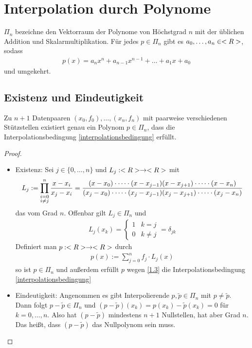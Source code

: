 \section{Interpolation durch Polynome}

$\Pi_n$ bezeichne den Vektorraum der Polynome von Höchstgrad $n$ mit der üblichen Addition und Skalarmultiplikation. Für jedes $p\in\Pi_n$ gibt es $a_0,\dots,a_n\in<R>$, sodass
\begin{align}
	p(x) = a_nx^n+a_{n-1}x^{n-1}+\dots+a_1x+a_0
\end{align}
und umgekehrt.

\subsection{Existenz und Eindeutigkeit}

\begin{proposition}
	Zu $n+1$ Datenpaaren $(x_0,f_0),\dots,(x_n,f_n)$ mit paarweise verschiedenen Stützstellen existiert genau ein Polynom $p\in\Pi_n$, dass die Interpolationsbedingung  \cref{interpolationsbedingung} erfüllt.
\end{proposition}
\begin{proof}
	\begin{itemize}
		\item Existenz: Sei $j\in\{0,\dots,n\}$ und $L_j:<R>\to<R>$ mit
		\begin{align}
			L_j := \prod_{\substack{i=0\\ i\neq j}}^{n} \frac{x-x_i}{x_j-x_i}= \frac{(x-x_0)\cdot\dots\cdot(x-x_{j-1})(x-x_{j+1})\cdot\dots\cdot(x-x_n)} {(x_j-x_0)\cdot\dots\cdot(x_j-x_{j-1})(x_j-x_{j+1})\cdot\dots\cdot(x_j-x_n)}\notag
		\end{align}
		das  vom Grad $n$. Offenbar gilt $L_j\in\Pi_n$ und 
		\begin{align}
			\label{1.3}
			L_j(x_k)=\begin{cases}
				1 & k=j \\ 0 & k\neq j
			\end{cases} = \delta_{jk}
		\end{align}
		Definiert man $p:<R>\to<R>$ durch
		\begin{align}
			\label{1.4}
			p(x) := \sum_{j=0}^{n} f_j\cdot L_j(x)
		\end{align}
		so ist $p\in\Pi_n$ und außerdem erfüllt $p$ wegen \cref{1.3} die Interpolationsbedingung \cref{interpolationsbedingung}
		\item Eindeutigkeit: Angenommen es gibt Interpolierende $p,\tilde{p}\in\Pi_n$ mit $p\neq\tilde{p}$. Dann folgt $p-\tilde{p}\in\Pi_n$ und $(p-\tilde{p})(x_k)=p(x_k)-\tilde{p}(x_k)=0$ für $k=0,\dots,n$. Also hat $(p-\tilde{p})$ mindestens $n+1$ Nullstellen, hat aber Grad $n$. Das heißt, dass $(p-\tilde{p})$ das Nullpolynom sein muss.
	\end{itemize}
\end{proof}

